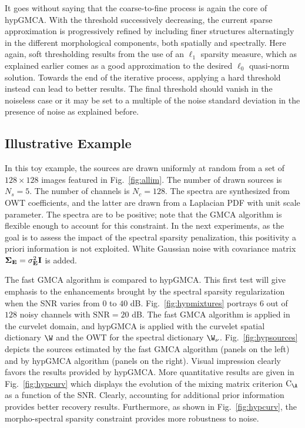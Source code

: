 It goes without saying that the coarse-to-fine process is again the core of hypGMCA. With the threshold successively decreasing, the current sparse approximation is progressively refined by including finer structures alternatingly in the different morphological components, both spatially and spectrally. Here again, soft thresholding results from the use of an $\ell_1$ sparsity measure, which as explained earlier comes as a good approximation to the desired $\ell_0$ quasi-norm solution. Towards the end of the iterative process, applying a hard threshold instead can lead to better results. The final threshold should vanish in the noiseless case or it may be set to a multiple of the noise standard deviation in the presence of noise as explained before. 


\subsection{Illustrative Example}
\label{sec:expe_hyper}
 
In this toy example, the sources are drawn uniformly at random from a set of $128 \times 128$ images featured in Fig.\ \ref{fig:allim}. The number of drawn sources is $N_s=5$. The number of channels is $ N_c =128$. The spectra are synthesized from OWT coefficients, and the latter are drawn from a Laplacian PDF with unit scale parameter. The spectra are to be positive; note that the GMCA algorithm is flexible enough to account for this constraint. In the next experiments, as the goal is to assess the impact of the spectral sparsity penalization, this positivity a priori information is not exploited. White Gaussian noise with covariance matrix ${\boldsymbol \Sigma}_{\bf E} = \sigma_{\bf E}^2 \bf I$ is added.

The fast GMCA algorithm is compared to hypGMCA. This first test will give emphasis to the enhancements brought by the spectral sparsity regularization when the SNR varies from $0$ to $40$ dB. Fig.\ \ref{fig:hypmixtures} portrays $6$ out of $128$ noisy channels with $\mbox{SNR} = 20$ dB. The fast GMCA algorithm is applied in the curvelet domain, and hypGMCA is applied with the curvelet spatial dictionary $\W$ and the OWT for the spectral dictionary $\W_\nu$. Fig.\ \ref{fig:hypsources} depicts the sources estimated by the fast GMCA algorithm (panels on the left) and by hypGMCA algorithm (panels on the right). Visual impression clearly favors the results provided by hypGMCA. More quantitative results are given in Fig.\ \ref{fig:hypcurv} which displays the evolution of the mixing matrix criterion $\mathrm{C}_{\A}$ as a function of the SNR. Clearly, accounting for additional prior information provides better recovery results. Furthermore, as shown in Fig.\ \ref{fig:hypcurv}, the morpho-spectral sparsity constraint provides more robustness to noise.

